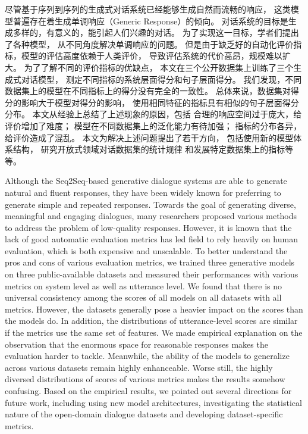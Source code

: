 \begin{cabstract}
    尽管基于序列到序列的生成式对话系统已经能够生成自然而流畅的响应，
    这类模型普遍存在着生成单调响应（Generic Response）的倾向。
    对话系统的目标是生成多样的，有意义的，能引起人们兴趣的对话。
    为了实现这一目标，学者们提出了各种模型，
    从不同角度解决单调响应的问题。
    但是由于缺乏好的自动化评价指标，模型的评估高度依赖于人类评价，
    导致评估系统的代价高昂，规模难以扩大。
    为了了解不同的评价指标的优缺点，
    本文在三个公开数据集上训练了三个生成式对话模型，
    测定不同指标的系统层面得分和句子层面得分。
    我们发现，不同数据集上的模型在不同指标上的得分没有完全的一致性。
    总体来说，数据集对得分的影响大于模型对得分的影响，
    使用相同特征的指标具有相似的句子层面得分分布。
    本文从经验上总结了上述现象的原因，包括
    合理的响应空间过于庞大，给评价增加了难度；
    模型在不同数据集上的泛化能力有待加强；
    指标的分布各异，给评价造成了混乱。
    本文为解决上述问题提出了若干方向，
    包括使用新的模型体系结构，
    研究开放式领域对话数据集的统计规律
    和发展特定数据集上的指标等等。
\end{cabstract}

\begin{eabstract}
    Although the Seq2Seq-based generative dialogue systems are
    able to generate natural and
    fluent responses,
    they have been widely known for preferring to generate
    simple and repeated responses.
    Towards the goal of generating diverse, meaningful and
    engaging dialogues,
    many researchers proposed various methods to address the
    problem of low-quality responses.
    However, it is known that the
    lack of good automatic evaluation metrics
    has led field to rely heavily on human evaluation,
    which is both expensive and unscalable.
    To better understand the pros and cons of various
    evaluation metrics,
    we trained three generative models on
    three public-available datasets and measured their
    performances with various metrics on system level
    as well as utterance level.
    We found that there is no universal consistency among
    the scores of all models on all datasets with all metrics.
    However, the datasets generally pose a heavier impact on
    the scores than the models do.
    In addition, the distributions of
    utterance-level scores are similar if the metrics use the same
    set of features.
    We made empirical explanation on the
    observation that the enormous space for reasonable responses
    makes the evaluation harder to tackle.
    Meanwhile, the ability of the models to generalize across
    various datasets remain highly enhanceable.
    Worse still, the highly diversed distributions of scores
    of various metrics makes the results somehow confusing.
    Based on the empirical results, we pointed out several
    directions for future work, including using new model
    architectures, investigating the statistical nature of
    the open-domain dialogue datasets and
    developing dataset-specific metrics.
\end{eabstract}
